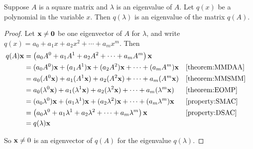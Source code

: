 \documentclass{ximera}
\begin{document}
\begin{theorem}
\label{theorem:EPM}

Suppose $A$ is a square matrix and $\lambda$ is an eigenvalue of $A$.
Let $q(x)$ be a polynomial in the variable $x$.  Then $q(\lambda)$ is
an eigenvalue of the matrix $q(A)$.





\begin{proof}
Let $\mathbf{x}\neq\mathbf{0}$ be one eigenvector of $A$ for $\lambda$, and write $q(x)=a_0+a_1x+a_2x^2+\cdots+a_mx^m$.  Then
\begin{align*}
q(A)\mathbf{x}&=\left(a_0A^0+a_1A^1+a_2A^2+\cdots+a_mA^m\right)\mathbf{x}\\
&=(a_0A^0)\mathbf{x}+(a_1A^1)\mathbf{x}+(a_2A^2)\mathbf{x}+\cdots+(a_mA^m)\mathbf{x}&&\ref{theorem:MMDAA}\\
&=a_0(A^0\mathbf{x})+a_1(A^1\mathbf{x})+a_2(A^2\mathbf{x})+\cdots+a_m(A^m\mathbf{x})&&\ref{theorem:MMSMM}\\
&=a_0(\lambda^0\mathbf{x})+a_1(\lambda^1\mathbf{x})+a_2(\lambda^2\mathbf{x})+\cdots+a_m(\lambda^m\mathbf{x})&&\ref{theorem:EOMP}\\
&=(a_0\lambda^0)\mathbf{x}+(a_1\lambda^1)\mathbf{x}+(a_2\lambda^2)\mathbf{x}+\cdots+(a_m\lambda^m)\mathbf{x}&&\ref{property:SMAC}\\
&=\left(a_0\lambda^0+a_1\lambda^1+a_2\lambda^2+\cdots+a_m\lambda^m\right)\mathbf{x}&&\ref{property:DSAC}\\
&=q(\lambda)\mathbf{x}
\end{align*}




So $\mathbf{x}\neq 0$ is an eigenvector of $q(A)$ for the eigenvalue $q(\lambda)$.



\end{proof}
\end{theorem}
\end{document}
